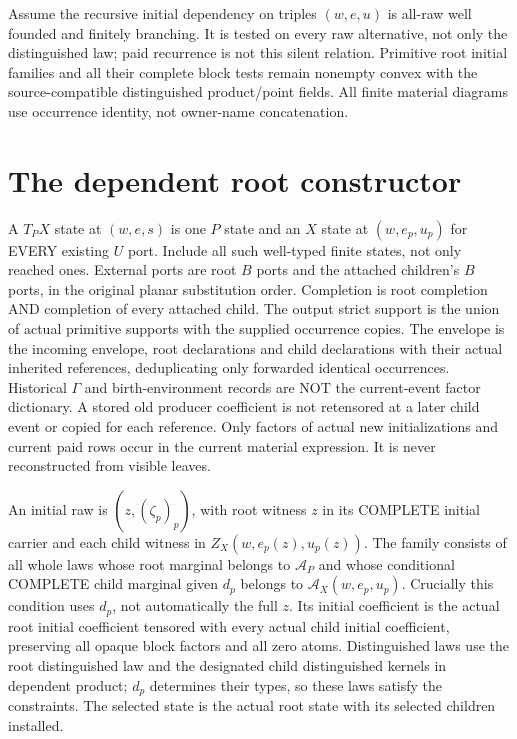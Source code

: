 \documentclass[11pt]{article}
\begin{document}
Assume the recursive initial dependency on triples $(w,e,u)$ is all-raw well founded and finitely branching. It is tested on every raw alternative, not only the distinguished law; paid recurrence is not this silent relation. Primitive root initial families and all their complete block tests remain nonempty convex with the source-compatible distinguished product/point fields. All finite material diagrams use occurrence identity, not owner-name concatenation.

\section{The dependent root constructor}
A $T_PX$ state at $(w,e,s)$ is one $P$ state and an $X$ state at $(w,e_p,u_p)$ for EVERY existing $U$ port. Include all such well-typed finite states, not only reached ones. External ports are root $B$ ports and the attached children's $B$ ports, in the original planar substitution order. Completion is root completion AND completion of every attached child. The output strict support is the union of actual primitive supports with the supplied occurrence copies. The envelope is the incoming envelope, root declarations and child declarations with their actual inherited references, deduplicating only forwarded identical occurrences. Historical $\Gamma$ and birth-environment records are NOT the current-event factor dictionary. A stored old producer coefficient is not retensored at a later child event or copied for each reference. Only factors of actual new initializations and current paid rows occur in the current material expression. It is never reconstructed from visible leaves.

An initial raw is $(z,(\zeta_p)_p)$, with root witness $z$ in its COMPLETE initial carrier and each child witness in $Z_X(w,e_p(z),u_p(z))$. The family consists of all whole laws whose root marginal belongs to $\mathcal A_P$ and whose conditional COMPLETE child marginal given $d_p$ belongs to $\mathcal A_X(w,e_p,u_p)$. Crucially this condition uses $d_p$, not automatically the full $z$. Its initial coefficient is the actual root initial coefficient tensored with every actual child initial coefficient, preserving all opaque block factors and all zero atoms. Distinguished laws use the root distinguished law and the designated child distinguished kernels in dependent product; $d_p$ determines their types, so these laws satisfy the constraints. The selected state is the actual root state with its selected children installed.
\end{document}
